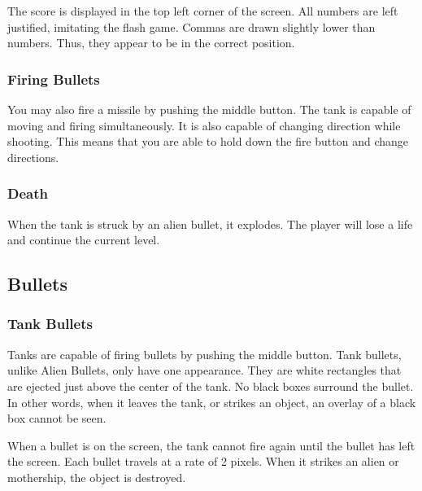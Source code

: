 \documentclass[11pt,letter,oneside]{report}
\begin{document}
The score is displayed in the top left corner of the screen. All numbers are left justified, imitating the flash game. Commas are drawn slightly lower than numbers. Thus, they appear to be in the correct position.


\subsubsection{Firing Bullets}
You may also fire a missile by pushing the middle button. The tank is capable of moving and firing simultaneously. It is also capable of changing direction while shooting. This means that you are able to hold down the fire button and change directions.
\subsubsection{Death}
When the tank is struck by an alien bullet, it explodes.  The player will lose a life and continue the current level.

\subsection{Bullets}
\subsubsection{Tank Bullets}
Tanks are capable of firing bullets by pushing the middle button. Tank bullets, unlike Alien Bullets, only have one appearance. They are white rectangles that are ejected just above the center of the tank. No black boxes surround the bullet. In other words, when it leaves the tank, or strikes an object, an overlay of a black box cannot be seen. 

When a bullet is on the screen, the tank cannot fire again until the bullet has left the screen. Each bullet travels at a rate of 2 pixels. When it strikes an alien or mothership, the object is destroyed.
\end{document}
